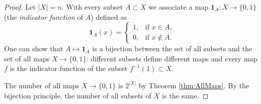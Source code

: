 

\setcounter{section}{2}
\setcounter{subsection}{2}
\setcounter{dfn}{3}

\begin{proof}
Let $|X| = n$. With every subset $A \subset X$ we associate a map $\mathbf{1}_A \colon X \to \{0,1\}$ (the \emph{indicator function} of $A$) defined as
\[
\mathbf{1}_A(x) =
\begin{cases}
1, &\text{if } x \in A,\\
0, &\text{if } x \notin A.
\end{cases}
\]
One can show that $A \mapsto \mathbf{1}_A$ is a bijection between the set of all subsets and the set of all maps $X \to \{0,1\}$:
different subsets define different maps and every map $f$ is the indicator function of the subset $f^{-1}(1) \subset X$.

The number of all maps $X \to \{0,1\}$ is $2^{|X|}$ by Theorem \ref{thm:AllMaps}.
By the bijection principle, the number of all subsets of $X$ is the same.
\end{proof}


